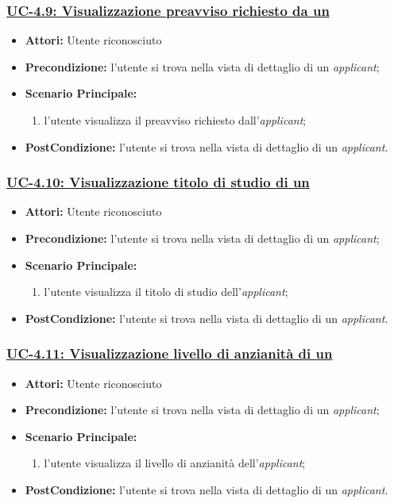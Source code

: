 \subsubsection{\underline{UC-4.9: Visualizzazione preavviso richiesto da un \applicant}}
\begin{itemize}
	\item \textbf{Attori:} Utente riconosciuto
	\item \textbf{Precondizione:} l'utente si trova nella vista di dettaglio di un \textit{applicant};
	\item \textbf{Scenario Principale:}
	\begin{enumerate} 
		\item l'utente visualizza il preavviso richiesto dall'\textit{applicant};
	\end{enumerate}
	\item \textbf{PostCondizione:} l'utente si trova nella vista di dettaglio di un \textit{applicant}.
\end{itemize}

\subsubsection{\underline{UC-4.10: Visualizzazione titolo di studio di un \applicant}}
\begin{itemize}
	\item \textbf{Attori:} Utente riconosciuto
	\item \textbf{Precondizione:} l'utente si trova nella vista di dettaglio di un \textit{applicant};
	\item \textbf{Scenario Principale:}
	\begin{enumerate} 
		\item l'utente visualizza il titolo di studio dell'\textit{applicant};
	\end{enumerate}
	\item \textbf{PostCondizione:} l'utente si trova nella vista di dettaglio di un \textit{applicant}.
\end{itemize}

\subsubsection{\underline{UC-4.11: Visualizzazione livello di anzianità di un \applicant}}
\begin{itemize}
	\item \textbf{Attori:} Utente riconosciuto
	\item \textbf{Precondizione:} l'utente si trova nella vista di dettaglio di un \textit{applicant};
	\item \textbf{Scenario Principale:}
	\begin{enumerate} 
		\item l'utente visualizza il livello di anzianità dell'\textit{applicant};
	\end{enumerate}
	\item \textbf{PostCondizione:} l'utente si trova nella vista di dettaglio di un \textit{applicant}.
\end{itemize}

